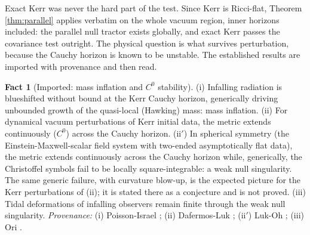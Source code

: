\documentclass[11pt]{article}
\theoremstyle{definition}
\newtheorem{fact}[theorem]{Fact}
\begin{document}
Exact Kerr was never the hard part of the test. Since Kerr is Ricci-flat, Theorem \ref{thm:parallel} applies verbatim on the whole vacuum region, inner horizons included: the parallel null tractor exists globally, and exact Kerr passes the covariance test outright. The physical question is what survives perturbation, because the Cauchy horizon is known to be unstable. The established results are imported with provenance and then read.

\begin{fact}[Imported: mass inflation and $C^0$ stability]\label{fact:cauchy}
(i) Infalling radiation is blueshifted without bound at the Kerr Cauchy horizon, generically driving unbounded growth of the quasi-local (Hawking) mass: mass inflation. (ii) For dynamical vacuum perturbations of Kerr initial data, the metric extends continuously ($C^0$) across the Cauchy horizon. (ii$'$) In spherical symmetry (the Einstein-Maxwell-scalar field system with two-ended asymptotically flat data), the metric extends continuously across the Cauchy horizon while, generically, the Christoffel symbols fail to be locally square-integrable: a weak null singularity. The same generic failure, with curvature blow-up, is the expected picture for the Kerr perturbations of (ii); it is stated there as a conjecture and is not proved. (iii) Tidal deformations of infalling observers remain finite through the weak null singularity. \emph{Provenance:} (i) Poisson-Israel \cite{PoissonIsrael1990}; (ii) Dafermos-Luk \cite{DafermosLuk2017}; (ii$'$) Luk-Oh \cite{LukOh2019a,LukOh2019b}; (iii) Ori \cite{Ori1991}.
\end{fact}
\end{document}

